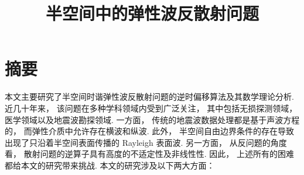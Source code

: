\confidential{}%
\title{ 半空间中的弹性波反散射问题}%
\author{}%
\advisor{}%
\advisorsec{}%
\englishauthor{}%
\maketitle%
\makeenglishtitle%
\makedeclaration%
\chapter*{摘\quad 要}%
\setcounter{page}{1}%

本文主要研究了半空间时谐弹性波反散射问题的逆时偏移算法及其数学理论分析. 近几十年来，  该问题在多种学科领域内受到广泛关注，  其中包括无损探测领域，医学领域以及地震波勘探领域.  一方面， 传统的地震波数据处理都是基于声波方程的， 而弹性介质中允许存在横波和纵波. 此外， 半空间自由边界条件的存在导致出现了只沿着半空间表面传播的 Rayleigh 表面波. 另一方面， 从反问题的角度看，  散射问题的逆算子具有高度的不适定性及非线性性. 因此， 上述所有的困难都给本文的研究带来挑战.  本文的研究涉及以下两大方面：

